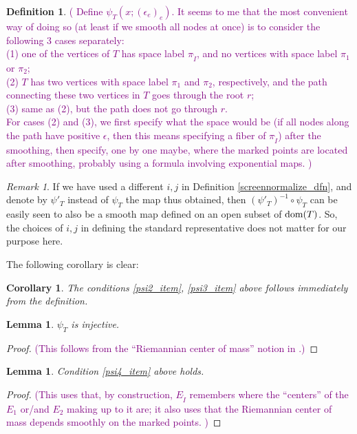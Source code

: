 \documentclass[11pt]{article}
\newtheorem{lmm}[thm]{Lemma}
\newtheorem{crl}[thm]{Corollary}
\theoremstyle{definition}
\newtheorem{dfn}[thm]{Definition}
\theoremstyle{remark}
\newtheorem{rmk}[thm]{Remark}
\def\mr#1{{\mathring{#1}}}
\def\dom{{\tn{dom}}}
\def\cmt#1{\textcolor{purple}{(#1)}}
\def\tn#1{\textnormal{#1}}
\begin{document}
\begin{dfn}
\cmt{
Define $\psi_T(x;(\epsilon_e)_e)$. 
It seems to me that the most convenient way of doing so (at least if we smooth all nodes at once) is to consider the following 3 cases separately: \\
(1) one of the vertices of $T$ has space label $\pi_{\mr{I}}$, and no vertices with space label $\pi_1$ or $\pi_2$; \\
(2) $T$ has two vertices with space label $\pi_1$ and $\pi_2$, respectively, and the path connecting these two vertices in $T$ goes through the root $r$; \\
(3) same as (2), but the path does not go through $r$.\\ 
For cases (2) and (3), we first specify what the space would be (if all nodes along the path have positive $\epsilon$, then this means specifying a fiber of $\pi_{\mr{I}}$) after the smoothing, then specify, one by one maybe, where the marked points are located after smoothing, probably using a formula involving exponential maps.  
}
\end{dfn}

 \begin{rmk}
If we have used a different $i,j$ in Definition \ref{screennormalize_dfn}, and denote by $\psi'_T$ instead of $\psi_T$ the map thus obtained, then $(\psi'_T)^{-1}\circ\psi_T$ can be easily seen to also be a smooth map defined on an open subset of $\dom(T)$. So, the choices of $i,j$ in defining the standard representative does not matter for our purpose here. 
\end{rmk}

The following corollary is clear:  

\begin{crl}
The conditions \ref{psi2_item}, \ref{psi3_item} above follows immediately from the definition. 
\end{crl}

\begin{lmm}
$\psi_T$ is injective. 
\end{lmm}
\begin{proof}
\cmt{This follows from the ``Riemannian center of mass'' notion in \cite{GroveKarcher}.}
\end{proof}

\begin{lmm}%
Condition \ref{psi4_item} above holds.
\end{lmm}

\begin{proof}
\cmt{This uses that, by construction, $E_{\mr{I}}$ remembers where the ``centers'' of the $E_1$ or/and $E_2$ making up to it are; it also uses that the Riemannian center of mass depends smoothly on the marked points. }
\end{proof}
\end{document}
